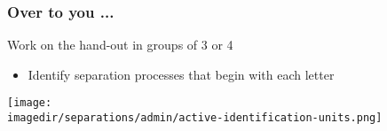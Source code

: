 \begin{frame}\frametitle{Over to you ...}
	Work on the hand-out in groups of 3 or 4
	\begin{itemize}
		\item	Identify separation processes that begin with each letter
	\end{itemize}
	\begin{center}
		\texttt{[image: \\imagedir/separations/admin/active-identification-units.png]}
	\end{center}
\end{frame}

